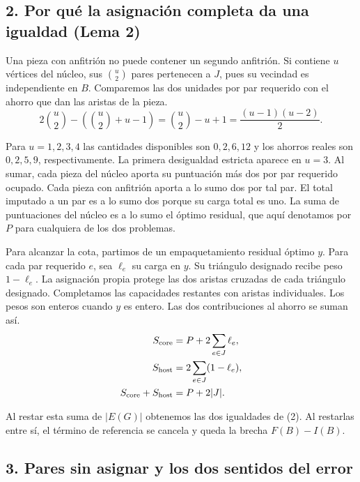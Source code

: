 \documentclass[spanish,11pt,a4paper]{article}
\begin{document}
\subsection{2. Por qué la asignación completa da una igualdad (Lema 2)}\label{por-quuxe9-la-asignaciuxf3n-completa-da-una-igualdad-lema-2}

Una pieza con anfitrión no puede contener un segundo anfitrión. Si contiene \(u\) vértices del núcleo, sus \(\binom u2\) pares pertenecen a \(J\), pues su vecindad es independiente en \(B\). Comparemos las dos unidades por par requerido con el ahorro que dan las aristas de la pieza.
\[
2\binom u2-\left(\binom u2+u-1\right)=\binom u2-u+1=\frac{(u-1)(u-2)}2.
\]

Para \(u=1,2,3,4\) las cantidades disponibles son \(0,2,6,12\) y los ahorros reales son \(0,2,5,9\), respectivamente. La primera desigualdad estricta aparece en \(u=3\). Al sumar, cada pieza del núcleo aporta su puntuación más dos por par requerido ocupado. Cada pieza con anfitrión aporta a lo sumo dos por tal par. El total imputado a un par es a lo sumo dos porque su carga total es uno. La suma de puntuaciones del núcleo es a lo sumo el óptimo residual, que aquí denotamos por \(P\) para cualquiera de los dos problemas.

Para alcanzar la cota, partimos de un empaquetamiento residual óptimo \(y\). Para cada par requerido \(e\), sea \(\ell_e\) su carga en \(y\). Su triángulo designado recibe peso \(1-\ell_e\). La asignación propia protege las dos aristas cruzadas de cada triángulo designado. Completamos las capacidades restantes con aristas individuales. Los pesos son enteros cuando \(y\) es entero. Las dos contribuciones al ahorro se suman así.
\[
\begin{aligned}
S_{\rm core}&=P+2\sum_{e\in J}\ell_e,\\
S_{\rm host}&=2\sum_{e\in J}(1-\ell_e),\\
S_{\rm core}+S_{\rm host}&=P+2|J|.
\end{aligned}
\]

Al restar esta suma de \(|E(G)|\) obtenemos las dos igualdades de (2). Al restarlas entre sí, el término de referencia se cancela y queda la brecha \(F(B)-I(B)\).

\subsection{3. Pares sin asignar y los dos sentidos del error}\label{pares-sin-asignar-y-los-dos-sentidos-del-error}
\end{document}
